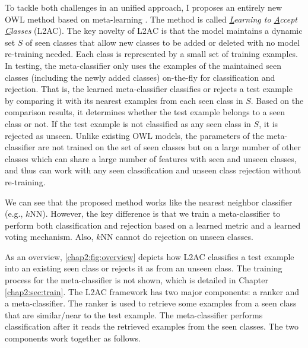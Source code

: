 To tackle both challenges in an unified approach, I proposes an entirely new OWL method based on meta-learning \cite{thrun2012learning,andrychowicz2016learning,fernando2017pathnet,finn2017model,finn2018probabilistic}. The method is called \textit{\underline{L}earning to \underline{A}ccept \underline{C}lasses} (L2AC). The key novelty of L2AC is that the model maintains a dynamic set $S$ of seen classes that allow new classes to be added or deleted with no model re-training needed. Each class is represented by a small set of training examples. In testing, the meta-classifier only uses the examples of the maintained seen classes (including the newly added classes) on-the-fly for classification and rejection. That is, the learned meta-classifier classifies or rejects a test example by comparing it with its nearest examples from each seen class in $S$. Based on the comparison results, it determines whether the test example belongs to a seen class or not. If the test example is not classified as any seen class in $S$, it is rejected as unseen. Unlike existing OWL models, 
the parameters of the meta-classifier are not trained on the set of seen classes but on a large number of other classes which can share a large number of features with seen and unseen classes, and thus can work with any seen classification and unseen class rejection without re-training. 

We can see that the proposed method works like the nearest neighbor classifier (e.g., $k$NN). However, the key difference is that we train a meta-classifier to perform both classification and rejection based on a learned metric and a learned voting mechanism. Also, 
$k$NN cannot do rejection on unseen classes. 

As an overview, \ref{chap2:fig:overview} depicts how L2AC classifies a test example into an existing seen class or rejects it as from an unseen class. The training process for the meta-classifier is not shown, which is detailed in Chapter \ref{chap2:sec:train}. 
The L2AC framework has two major components: a ranker and a meta-classifier. 
The ranker is used to retrieve some examples from a seen class that are similar/near to the test example. The meta-classifier performs classification after it reads the retrieved examples from the seen classes. The two components work together as follows.

